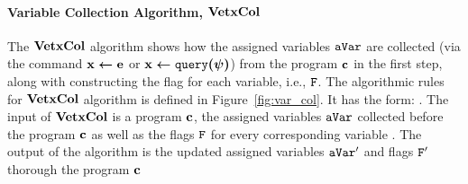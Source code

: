 \documentclass[a4paper,11pt]{article}
\begin{document}
\paragraph{Variable Collection Algorithm, $\bf{VetxCol}$}
The $\bf{VetxCol}$ algorithm shows how the assigned variables $\mathtt{aVar}$ are collected 
(via the command ${\boldsymbol{\mathbf{\mathrel{ x \leftarrow e }}}}$ or ${\boldsymbol{\mathbf{\mathrel{ x \leftarrow {\tt query}(\psi) }}}}$) from the program ${\boldsymbol{\mathbf{c}}}$ in the first step, 
along with constructing the flag for each variable, i.e., $\mathtt{F}$.
The algorithmic rules for $\bf{VetxCol}$ algorithm is defined in Figure~\ref{fig:var_col}. 
It has the form: 
. 
The input of $\bf{VetxCol}$ is a program ${\boldsymbol{\mathbf{c}}}$, 
the assigned variables $\mathtt{aVar}$ collected before the program ${\boldsymbol{\mathbf{c}}}$ 
as well as the flags $\mathtt{F}$ for every corresponding variable .
The output of the algorithm is the updated assigned variables $\mathtt{aVar}'$ and flags $\mathtt{F}'$ thorough the program ${\boldsymbol{\mathbf{c}}}$
%
%
\end{document}
